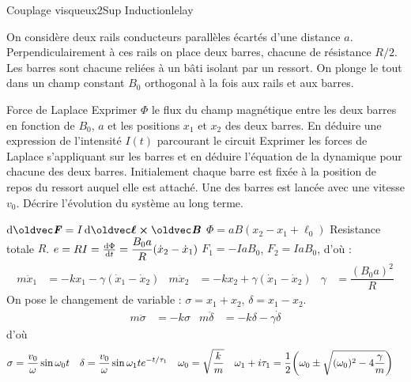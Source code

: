 \begin{exercise}{Couplage visqueux}{2}{Sup}
{Induction}{lelay}

On considère deux rails conducteurs parallèles écartés d'une distance $a$. Perpendiculairement à ces rails on place deux barres, chacune de résistance $R/2$. Les barres sont chacune reliées à un bâti isolant par un ressort. On plonge le tout dans un champ constant $B_0$ orthogonal à la fois aux rails et aux barres.

\begin{questions}
    \questioncours Force de Laplace
    \question Exprimer $\Phi$ le flux du champ magnétique entre les deux barres en fonction de $B_0$, $a$ et les positions $x_1$ et $x_2$ des deux barres.
    \question En déduire une expression de l'intensité $I(t)$ parcourant le circuit
    \question Exprimer les forces de Laplace s'appliquant sur les barres et en déduire l'équation de la dynamique pour chacune des deux barres.
    \question Initialement chaque barre est fixée à la position de repos du ressort auquel elle est attaché. Une des barres est lancée avec une vitesse $v_0$. Décrire l'évolution du système au long terme.
\end{questions}

\end{exercise}

\begin{solution}
    \begin{questions}
        \questioncours $\dd{\vec{F}} = I\dd{\vec{\ell}}\cross\vec{B}$
        \question $\Phi = a B(x_2 - x_1 + \ell_0)$
        \question Resistance totale $R$. $e = RI = \dv{\Phi}{t} = \dfrac{B_0 a}{R}(\dot{x}_2-\dot{x}_1)$
        \question $F_1 = -IaB_0$, $F_2 = IaB_0$, d'où :
        \begin{align*}
            m\ddot{x}_1 &= -kx_1-\gamma(\dot{x}_1-\dot{x}_2) &
            m\ddot{x}_2 &= -kx_2+\gamma(\dot{x}_1-\dot{x}_2) &
            \gamma &= \dfrac{(B_0 a)^2}{R}
        \end{align*}
        \question On pose le changement de variable : $\sigma = x_1 + x_2$, $\delta = x_1 - x_2$.
        \begin{align*}
            m\ddot{\sigma} &= -k\sigma &
            m\ddot{\delta} &= -k\delta-\gamma\dot{\delta}
        \end{align*}
        d'où
        \begin{align*}
            \sigma &= \dfrac{v_0}{\omega}\sin\omega_0 t &
            \delta &= \dfrac{v_0}{\omega}\sin\omega_1 t e^{-t/\tau_1} &
            \omega_0 &= \sqrt{\dfrac{k}{m}} & \omega_1 + i\tau_1 &= \dfrac{1}{2}\qty(\omega_0 \pm \sqrt{(\omega_0)^2 - 4\dfrac{\gamma}{m}})
        \end{align*}
    \end{questions}
\end{solution}

